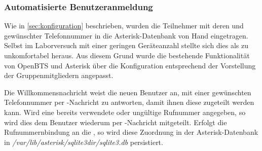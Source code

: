 \subsubsection{Automatisierte Benutzeranmeldung}
Wie in \autoref{sec:konfiguration} beschrieben, wurden die Teilnehmer mit deren \IMSI und gewünschter Telefonnummer in die Asterisk-Datenbank von Hand eingetragen. Selbst im Laborversuch mit einer geringen Geräteanzahl stellte sich dies als zu unkomfortabel heraus.
Aus diesem Grund wurde die bestehende Funktionalität von OpenBTS und Asterisk über die Konfiguration entsprechend der Vorstellung der Gruppenmitgliedern angepasst.

Die Willkommensnachricht weist die neuen Benutzer an, mit einer gewünschten Telefonnummer per \SMS-Nachricht zu antworten, damit ihnen diese zugeteilt werden kann. Wird eine bereits verwendete oder ungültige Rufnummer angegeben, so wird dies dem Benutzer wiederum per \SMS-Nachricht mitgeteilt.
Erfolgt die Rufnummernbindung an die \IMSI, so wird diese Zuordnung in der Asterisk-Datenbank in \emph{/var/lib/asterisk/sqlite3dir/sqlite3.db} persistiert.


